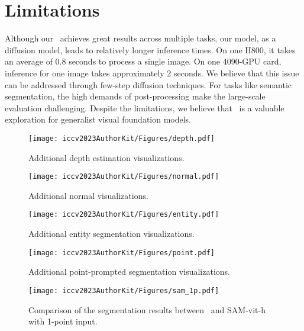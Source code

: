 
\section{Limitations}
Although our \ours\ achieves great results across multiple tasks, our model, as a diffusion model, leads to relatively longer inference times. On one H800, it takes an average of 0.8 seconds to process a single image. On one 4090-GPU card, inference for one image takes approximately 2 seconds. We believe that this issue can be addressed through few-step diffusion techniques. 
For tasks like semantic segmentation, the high demands of post-processing make the large-scale evaluation challenging.
Despite the limitations, we believe that \ours\ is a valuable exploration for generalist visual foundation models.

\clearpage
\begin{figure*}[htbp]
  \centering
  \texttt{[image: iccv2023AuthorKit/Figures/depth.pdf]}
  \caption{
   Additional depth estimation visualizations.
  }
  \label{fig:depth}
\end{figure*}

\clearpage
\begin{figure*}[htbp]
  \centering
  \texttt{[image: iccv2023AuthorKit/Figures/normal.pdf]}
  \caption{
   Additional normal visualizations.
  }
  \label{fig:normal}
\end{figure*}

\clearpage
\begin{figure*}[htbp]
  \centering
  \texttt{[image: iccv2023AuthorKit/Figures/entity.pdf]}
  \caption{
   Additional entity segmentation visualizations.
  }
  \label{fig:entity}
\end{figure*}

\clearpage
\begin{figure*}[htbp]
  \centering
  \texttt{[image: iccv2023AuthorKit/Figures/point.pdf]}
  \caption{
   Additional point-prompted segmentation visualizations.
  }
  \label{fig:sam}
\end{figure*}

\clearpage
\begin{figure*}[htbp]
  \centering
  \texttt{[image: iccv2023AuthorKit/Figures/sam\_1p.pdf]}
  \caption{
   Comparison of the segmentation results between \ours\ and SAM-vit-h with 1-point input. 
   }
  \label{fig:sam_1p}
\end{figure*}


